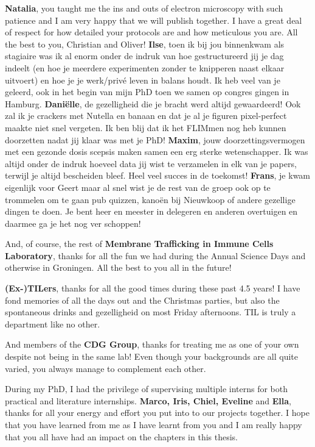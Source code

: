 \textbf{Natalia}, you taught me the ins and outs of electron microscopy with such patience and I am very happy that we will publish together. I have a great deal of respect for how detailed your protocols are and how meticulous you are. All the best to you, Christian and Oliver! \textbf{Ilse}, toen ik bij jou binnenkwam als stagiaire was ik al enorm onder de indruk van hoe gestructureerd jij je dag indeelt (en hoe je meerdere experimenten zonder te knipperen naast elkaar uitvoert) en hoe je je werk/privé leven in balans houdt. Ik heb veel van je geleerd, ook in het begin van mijn PhD toen we samen op congres gingen in Hamburg. \textbf{Daniëlle}, de gezelligheid die je bracht werd altijd gewaardeerd! Ook zal ik je crackers met Nutella en banaan en dat je al je figuren pixel-perfect maakte niet snel vergeten. Ik ben blij dat ik het FLIMmen nog heb kunnen doorzetten nadat jij klaar was met je PhD! \textbf{Maxim}, jouw doorzettingsvermogen met een gezonde dosis scepsis maken samen een erg sterke wetenschapper. Ik was altijd onder de indruk hoeveel data jij wist te verzamelen in elk van je papers, terwijl je altijd bescheiden bleef. Heel veel succes in de toekomst! \textbf{Frans}, je kwam eigenlijk voor Geert maar al snel wist je de rest van de groep ook op te trommelen om te gaan pub quizzen, kanoën bij Nieuwkoop of andere gezellige dingen te doen. Je bent heer en meester in delegeren en anderen overtuigen en daarmee ga je het nog ver schoppen!

And, of course, the rest of \textbf{Membrane Trafficking in Immune Cells Laboratory}, thanks for all the fun we had during the Annual Science Days and otherwise in Groningen. All the best to you all in the future!

\textbf{(Ex-)TILers}, thanks for all the good times during these past 4.5 years! I have fond memories of all the days out and the Christmas parties, but also the spontaneous drinks and gezelligheid on most Friday afternoons. TIL is truly a department like no other.

And members of the \textbf{CDG Group}, thanks for treating me as one of your own despite not being in the same lab! Even though your backgrounds are all quite varied, you always manage to complement each other.

During my PhD, I had the privilege of supervising multiple interns for both practical and literature internships. \textbf{Marco, Iris, Chiel, Eveline} and \textbf{Ella}, thanks for all your energy and effort you put into to our projects together. I hope that you have learned from me as I have learnt from you and I am really happy that you all have had an impact on the chapters in this thesis. 

